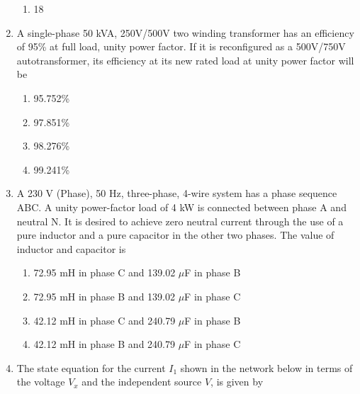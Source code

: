 \documentclass[journal]{IEEEtran}
\begin{document}
\begin{enumerate}
\begin{enumerate}
    \item 18\degree \\
\end{enumerate}
\item A single-phase 50 kVA, 250V/500V two winding transformer has an efficiency of 95\% at full load, unity power factor. If it is reconfigured as a 500V/750V autotransformer, its efficiency at its new rated load at unity power factor will be
\begin{enumerate}
   \item 95.752\%
   \item 97.851\%
   \item 98.276\%
   \item 99.241\% \\
\end{enumerate}
\item A 230 V (Phase), 50 Hz, three-phase, 4-wire system has a phase sequence ABC. A unity power-factor load of 4 kW is connected between phase A and neutral N. It is desired to achieve zero neutral current through the use of a pure inductor and a pure capacitor in the other two phases. The value of inductor and capacitor is
\begin{enumerate}
    \item 72.95 mH in phase C and 139.02 $\mu$F in phase B
    \item 72.95 mH in phase B and 139.02 $\mu$F in phase C
    \item 42.12 mH in phase C and 240.79 $\mu$F in phase B
    \item 42.12 mH in phase B and 240.79 $\mu$F in phase C \\
\end{enumerate}
\item The state equation for the current $I_1$ shown in the network below in terms of the voltage $V_x$ and the independent source $V$, is given by
\begin{figure}[!ht]
\centering
{}
\end{figure}
\end{enumerate}
\end{document}
